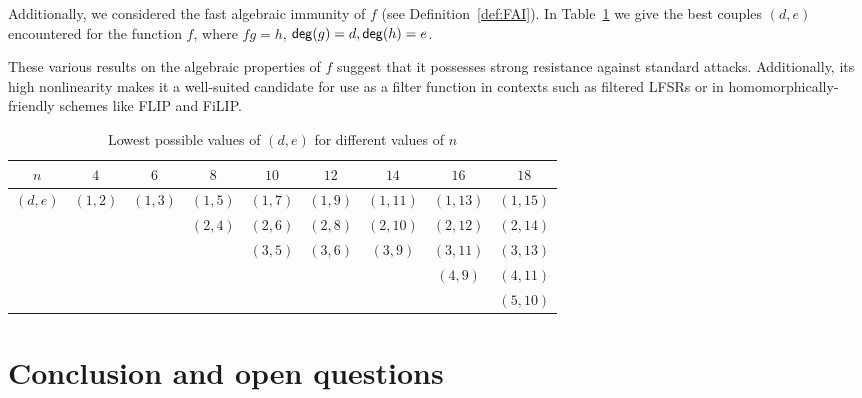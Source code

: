 \documentclass[11pt]{llncs}
\begin{document}
Additionally, we considered the fast algebraic immunity of $f$ (see Definition~\ref{def:FAI}). In Table~\ref{table:FAI} we give the best couples $(d,e)$ encountered for the function $f$, where $fg=h$, $\mathsf{deg}(g)=d, \mathsf{deg}(h)=e$. 


These various results on the algebraic properties of $f$ suggest that it possesses strong resistance against standard attacks. Additionally, its high nonlinearity makes it a well-suited candidate for use as a filter function in contexts such as filtered LFSRs or in homomorphically-friendly schemes like FLIP and FiLIP.






\begin{table}[h]
	\centering
	\begin{tabular}{|c|c|c|c|c|c|c|c|c|}
		\hline
		$ n $      & $4$     & $6$     & $8$     & $10$    & $12$    & $14$    & $16$    & $18$    \\ \hline
		$(d, e)$ & $(1,2)$ & $(1,3)$ & $(1,5)$  & $(1,7)$ & $(1,9)$ & $(1,11)$ & $(1,13)$ & $(1,15)$ \\ 
		 &     &    & $(2,4)$  & $(2,6)$ & $(2,8)$ & $(2,10)$ & $(2,12)$ & $(2,14)$\\ 
		 &     &    &     & $(3,5)$ & $(3,6)$ & $(3,9)$ & $(3,11)$ & $(3,13)$\\ 
		 &     &    &     &  &  &  & $(4,9)$ & $(4,11)$\\ 
	 &     &    &     &  &  &  &  & $(5,10)$ \\ \hline
	\end{tabular}
	\caption{Lowest possible values of $(d, e)$ for different values of $ n$}
	\label{table:FAI}
\end{table}

\section{Conclusion and open questions}

\newpage



\ifnum{}


\else


\fi
\end{document}
